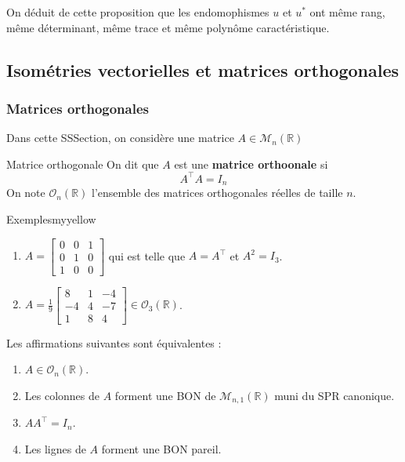     On déduit de cette proposition que les endomophismes $u$ et $u^*$ ont même rang, même déterminant, même trace et même polynôme caractéristique.

\subsection{Isométries vectorielles et matrices orthogonales}

    \subsubsection{Matrices orthogonales}

    Dans cette SSSection, on considère une matrice $A \in \mathcal{M}_n(\mathbb{R})$

    \begin{defi}{Matrice orthogonale}{}
        On dit que $A$ est une \textbf{matrice orthoonale} si 
        \[ A^{\top} A = I_n \]   
        On note $\mathcal{O}_{n}(\mathbb{R})$ l’ensemble des matrices orthogonales réelles de taille $n$. 
    \end{defi}

    \begin{omed}{Exemples}{myyellow}
        \begin{enumerate}[label = \textcolor{myyellow}{\arabic*.}]
            \item $A = \begin{bmatrix}
                0 & 0 & 1 \\
                0 & 1 & 0 \\
                1 & 0 & 0
            \end{bmatrix}$ qui est telle que $A = A^{\top}$ et $A^2 = I_3$.
            \item $A = \frac{1}{9} \begin{bmatrix}
                8 & 1 & -4 \\
                -4 & 4 & -7 \\
                1 & 8 & 4
            \end{bmatrix} \in \mathcal{O}_3(\mathbb{R})$.
        \end{enumerate}
    \end{omed}

    \begin{prop}{}{}
        Les affirmations suivantes sont équivalentes :
        \begin{enumerate}
            \item $A \in \mathcal{O}_n(\mathbb{R})$.
            \item Les colonnes de $A$ forment une BON de $\mathcal{M}_{n,1}(\mathbb{R})$ muni du SPR canonique.
            \item $A A^{\top} = I_n$.
            \item Les lignes de $A$ forment une BON pareil.
        \end{enumerate}
    \end{prop}

